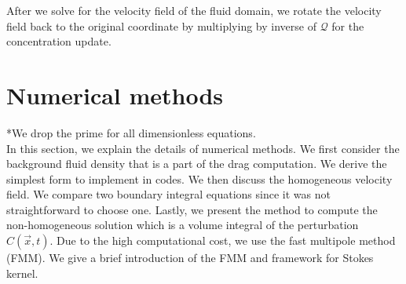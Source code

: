 After we solve for the velocity field of the fluid domain, we rotate the velocity field back to the original coordinate by multiplying by inverse of $\mathcal{Q}$ for the concentration update. 
\section{Numerical methods}
*We drop the prime for all dimensionless equations. 
\\
In this section, we explain the details of numerical methods. We first consider the background fluid density that is a part of the drag computation. We derive the simplest form to implement in codes. We then discuss the homogeneous velocity field. We compare two boundary integral equations since it was not straightforward to choose one. Lastly, we present the method to compute the non-homogeneous solution which is a volume integral of the perturbation $C(\vec{x},t)$. Due to the high computational cost, we use the fast multipole method (FMM). We give a brief introduction of the FMM and framework for Stokes kernel.
